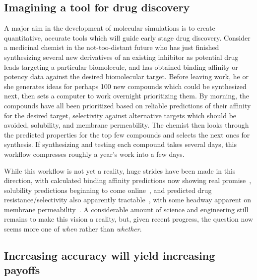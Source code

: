 \documentclass[aps,pre,twocolumn,nofootinbib,superscriptaddress,10pt, final,tightenlines]{revtex4-1}
\begin{document}
\subsection{Imagining a tool for drug discovery}
A major aim in the development of molecular simulations is to create quantitative, accurate tools which will guide early stage drug discovery. 
Consider a medicinal chemist in the not-too-distant future who has just finished synthesizing several new derivatives of an existing inhibitor as potential drug leads targeting a particular biomolecule, and has obtained binding affinity or potency data against the desired biomolecular target. 
Before leaving work, he or she generates ideas for perhaps 100 new compounds which could be synthesized next, then sets a computer to work overnight prioritizing them. 
By morning, the compounds have all been prioritized based on reliable predictions of their affinity for the desired target, selectivity against alternative targets which should be avoided, solubility, and membrane permeability.  
The chemist then looks through the predicted properties for the top few compounds and selects the next ones for synthesis. 
If synthesizing and testing each compound takes several days, this workflow compresses roughly a year's work into a few days.


While this workflow is not yet a reality, huge strides have been made in this direction, with calculated binding affinity predictions now showing real promise~\cite{mobley_perspective_2012, christ_accuracy_2014, deng_distinguishing_2015, sherborne_preprint_2016, schrodinger_accurate_2015, christ_binding_2016, cui_affinity_2016, verras_free_2016}, solubility predictions beginning to come online~\cite{schnieders_structure_2012, park_absolute_2014, liu_using_2016}, and predicted drug resistance/selectivity also apparently tractable~\cite{leonis_contribution_2013, leonis_contribution_2013}, with some headway apparent on membrane permeability~\cite{lee_permeability_2016, comer_permeability_2014}. 
A considerable amount of science and engineering still remains to make this vision a reality, but, given recent progress, the question now seems more one of \emph{when} rather than \emph{whether}. 

\subsection{Increasing accuracy will yield increasing payoffs}
\end{document}
